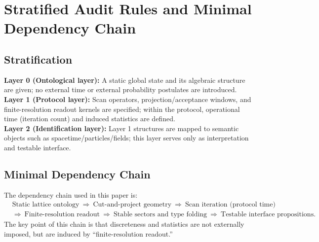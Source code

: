 \section{Stratified Audit Rules and Minimal Dependency Chain}

\subsection{Stratification}

\textbf{Layer 0 (Ontological layer):} A static global state and its algebraic structure are given; no external time or external probability postulates are introduced.\\
\textbf{Layer 1 (Protocol layer):} Scan operators, projection/acceptance windows, and finite-resolution readout kernels are specified; within the protocol, operational time (iteration count) and induced statistics are defined.\\
\textbf{Layer 2 (Identification layer):} Layer 1 structures are mapped to semantic objects such as spacetime/particles/fields; this layer serves only as interpretation and testable interface.

\subsection{Minimal Dependency Chain}

The dependency chain used in this paper is:
\[
\begin{aligned}
&\text{Static lattice ontology}\ \Rightarrow\ \text{Cut-and-project geometry}\ \Rightarrow\ \text{Scan iteration (protocol time)}\\
&\Rightarrow\ \text{Finite-resolution readout}\ \Rightarrow\ \text{Stable sectors and type folding}\ \Rightarrow\ \text{Testable interface propositions}.
\end{aligned}
\]
The key point of this chain is that discreteness and statistics are not externally imposed, but are induced by ``finite-resolution readout.''
